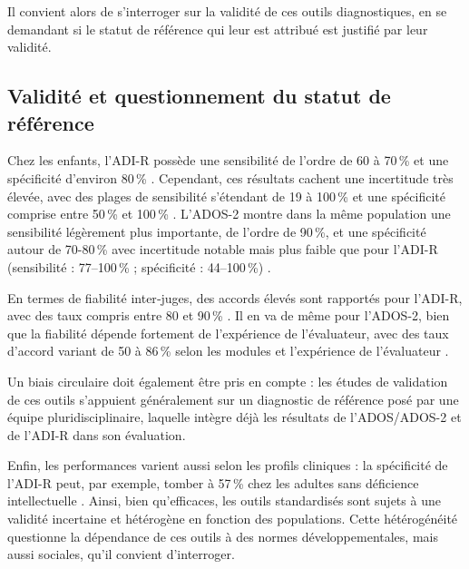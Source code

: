 \medskip

Il convient alors de s'interroger sur la validité de ces outils diagnostiques, en se demandant si le statut de référence qui leur est attribué est justifié par leur validité.

\subsection{Validité et questionnement du statut de référence}

Chez les enfants, l'ADI-R possède une sensibilité de l'ordre de 60 à 70\,\% et une spécificité d'environ 80\,\% \parencite{Lebersfeld2021Nov, Fulceri2025Jun, dosSantos2024Screening, Randall2018Jul}. Cependant, ces résultats cachent une incertitude très élevée, avec des plages de sensibilité s'étendant de 19 à 100\,\% et une spécificité comprise entre 50\,\% et 100\,\% \parencite{Lebersfeld2021Nov, Fulceri2025Jun}. L'ADOS-2 montre dans la même population une sensibilité légèrement plus importante, de l'ordre de 90\,\%, et une spécificité autour de 70-80\,\% avec incertitude notable mais plus faible que pour l'ADI-R (sensibilité : 77–100\,\% ; spécificité : 44–100\,\%) \parencite{Lebersfeld2021Nov, Fulceri2025Jun}. %

En termes de fiabilité inter‑juges, des accords élevés sont rapportés pour l'ADI-R, avec des taux compris entre 80 et 90\,\% \parencite{Lord1994Oct, Zander2017}. Il en va de même pour l'ADOS-2, bien que la fiabilité dépende fortement de l'expérience de l'évaluateur, avec des taux d'accord variant de 50 à 86\,\% selon les modules et l'expérience de l'évaluateur \parencite{Kamp-Becker2018Sep}.

Un biais circulaire doit également être pris en compte : les études de validation de ces outils s'appuient généralement sur un diagnostic de référence posé par une équipe pluridisciplinaire, laquelle intègre déjà les résultats de l'ADOS/ADOS-2 et de l'ADI-R dans son évaluation.

Enfin, les performances varient aussi selon les profils cliniques : la spécificité de l'ADI-R peut, par exemple, tomber à 57\,\% chez les adultes sans déficience intellectuelle \parencite{adamou_predicting_2021}. Ainsi, bien qu'efficaces, les outils standardisés sont sujets à une validité incertaine et hétérogène en fonction des populations. Cette hétérogénéité questionne la dépendance de ces outils à des normes développementales, mais aussi sociales, qu'il convient d'interroger.

